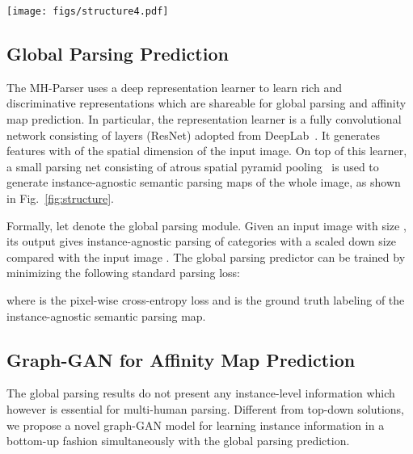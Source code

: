 \documentclass[10pt, letterpaper]{article}
\begin{document}
\begin{figure*}[t]
  \centering
  \texttt{[image: figs/structure4.pdf]}
  \caption{Architecture overview of the proposed Multiple Human Parser (MH-Parser). Here  refers to the global accordance map,  refers to the ground truth pairwise affinity map and  denotes the predictions.  is obtained by rule-based mapping from  and the corresponding superpixel map (see Eqn.~\eqref{eqn:gt_pam}~and~\eqref{eqn:majority_vote}), and  is the output of the graph generator (consisting of the representation learner and the affinity prediction net). The graph convolution discriminator takes the affinity graph from the graph generator as input and predicts whether it is a ground truth or a prediction. Fusing the predicted instance-agnostic parsing map and instance masks (constructed from ) gives the instance-aware parsing results.} \label{fig:structure}
\end{figure*}

\subsection{Global Parsing Prediction}
The MH-Parser uses a deep representation learner to learn rich and discriminative representations which are shareable for global parsing  and  affinity map prediction. In particular,  the representation learner is a fully convolutional network consisting of  layers (ResNet) adopted from DeepLab~\cite{chen2016deeplab}. It generates features with  of the spatial dimension of the input image. On top of this learner, a small parsing net consisting of atrous spatial pyramid pooling~\cite{chen2016deeplab} is used to generate instance-agnostic semantic parsing maps of the whole image, as shown in Fig.~\ref{fig:structure}.

Formally, let  denote the global parsing module. Given an input image  with size ,  its output  gives instance-agnostic parsing of  categories with a scaled down size compared with the input image . The global parsing predictor   can be trained by minimizing the following standard parsing loss:

where  is the pixel-wise cross-entropy loss and  is the ground truth labeling of the instance-agnostic semantic parsing map. 

\subsection{Graph-GAN for Affinity Map Prediction}
The global parsing results do not present any instance-level information which however is essential for multi-human parsing. Different from top-down solutions, we propose a novel graph-GAN model for learning instance information in a bottom-up fashion simultaneously with the global parsing prediction.
\end{document}
